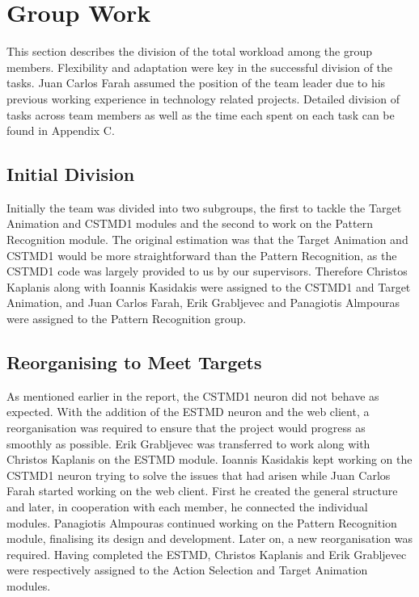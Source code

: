 \documentclass[a4paper,11pt]{article}
\begin{document}
\clearpage
\section{Group Work}

This section describes the division of the total workload among the group members. Flexibility and adaptation were key in the successful division of the tasks. Juan Carlos Farah assumed the position of the team leader due to his previous working experience in technology related projects. Detailed division of tasks across team members as well as the time each spent on each task can be found in Appendix C.

\subsection{Initial Division}
Initially the team was divided into two subgroups, the first to tackle the Target Animation and CSTMD1 modules and the second to work on the Pattern Recognition module. The original estimation was that the Target Animation and CSTMD1 would be more straightforward than the Pattern Recognition, as the CSTMD1 code was largely provided to us by our supervisors. Therefore Christos Kaplanis along with Ioannis Kasidakis were assigned to the CSTMD1 and Target Animation, and Juan Carlos Farah, Erik Grabljevec and Panagiotis Almpouras were assigned to the Pattern Recognition group.

\subsection{Reorganising to Meet Targets}
As mentioned earlier in the report, the CSTMD1 neuron did not behave as expected. With the addition of the ESTMD neuron and the web client, a reorganisation was required to ensure that the project would progress as smoothly as possible. Erik Grabljevec was transferred to work along with Christos Kaplanis on the ESTMD module. Ioannis Kasidakis kept working on the CSTMD1 neuron trying to solve the issues that had arisen while Juan Carlos Farah started working on the web client. First he created the general structure and later, in cooperation with each member, he connected the individual modules. Panagiotis Almpouras continued working on the Pattern Recognition module, finalising its design and development. Later on, a new reorganisation was required. Having completed the ESTMD, Christos Kaplanis and Erik Grabljevec were respectively assigned to the Action Selection and Target Animation modules.
\end{document}
